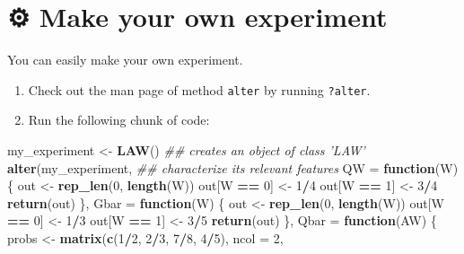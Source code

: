 \documentclass[11pt,openright,twoside]{book}
\newenvironment{Shaded}{\begin{snugshade}}{\end{snugshade}}
\newcommand{\CommentTok}[1]{\textcolor[rgb]{0.56,0.35,0.01}{\textit{#1}}}
\newcommand{\ControlFlowTok}[1]{\textcolor[rgb]{0.13,0.29,0.53}{\textbf{#1}}}
\newcommand{\DataTypeTok}[1]{\textcolor[rgb]{0.13,0.29,0.53}{#1}}
\newcommand{\DecValTok}[1]{\textcolor[rgb]{0.00,0.00,0.81}{#1}}
\newcommand{\KeywordTok}[1]{\textcolor[rgb]{0.13,0.29,0.53}{\textbf{#1}}}
\newcommand{\NormalTok}[1]{#1}
\newcommand{\OperatorTok}[1]{\textcolor[rgb]{0.81,0.36,0.00}{\textbf{#1}}}
\newcommand{\StringTok}[1]{\textcolor[rgb]{0.31,0.60,0.02}{#1}}
\newcommand{\gear}{\usebox{\gearbox}\;}
\theoremstyle{definition}
\theoremstyle{definition}
\theoremstyle{definition}
\theoremstyle{remark}
\begin{document}
\hypertarget{exo-make-own-experiment}{%
\section{\texorpdfstring{⚙ \gear Make your own experiment}{⚙ Make your own experiment}}\label{exo-make-own-experiment}}

You can easily make your own experiment.

\begin{enumerate}
\def\labelenumi{\arabic{enumi}.}
\item
  Check out the man page of method \texttt{alter} by running \texttt{?alter}.
\item
  Run the following chunk of code:
\end{enumerate}

\begin{Shaded}
\begin{Highlighting}[]
\NormalTok{my_experiment <-}\StringTok{ }\KeywordTok{LAW}\NormalTok{() }\CommentTok{## creates an object of class 'LAW'}
\KeywordTok{alter}\NormalTok{(my_experiment,   }\CommentTok{## characterize its relevant features}
      \DataTypeTok{QW =} \ControlFlowTok{function}\NormalTok{(W) \{}
\NormalTok{        out <-}\StringTok{ }\KeywordTok{rep_len}\NormalTok{(}\DecValTok{0}\NormalTok{, }\KeywordTok{length}\NormalTok{(W))}
\NormalTok{        out[W }\OperatorTok{==}\StringTok{ }\DecValTok{0}\NormalTok{] <-}\StringTok{ }\DecValTok{1}\OperatorTok{/}\DecValTok{4}
\NormalTok{        out[W }\OperatorTok{==}\StringTok{ }\DecValTok{1}\NormalTok{] <-}\StringTok{ }\DecValTok{3}\OperatorTok{/}\DecValTok{4}
        \KeywordTok{return}\NormalTok{(out)}
\NormalTok{      \},}
      \DataTypeTok{Gbar =} \ControlFlowTok{function}\NormalTok{(W) \{}
\NormalTok{        out <-}\StringTok{ }\KeywordTok{rep_len}\NormalTok{(}\DecValTok{0}\NormalTok{, }\KeywordTok{length}\NormalTok{(W))}
\NormalTok{        out[W }\OperatorTok{==}\StringTok{ }\DecValTok{0}\NormalTok{] <-}\StringTok{ }\DecValTok{1}\OperatorTok{/}\DecValTok{3}
\NormalTok{        out[W }\OperatorTok{==}\StringTok{ }\DecValTok{1}\NormalTok{] <-}\StringTok{ }\DecValTok{3}\OperatorTok{/}\DecValTok{5}
        \KeywordTok{return}\NormalTok{(out)}
\NormalTok{      \},}
      \DataTypeTok{Qbar =} \ControlFlowTok{function}\NormalTok{(AW) \{}
\NormalTok{        probs <-}\StringTok{ }\KeywordTok{matrix}\NormalTok{(}\KeywordTok{c}\NormalTok{(}\DecValTok{1}\OperatorTok{/}\DecValTok{2}\NormalTok{, }\DecValTok{2}\OperatorTok{/}\DecValTok{3}\NormalTok{, }\DecValTok{7}\OperatorTok{/}\DecValTok{8}\NormalTok{, }\DecValTok{4}\OperatorTok{/}\DecValTok{5}\NormalTok{), }\DataTypeTok{ncol =} \DecValTok{2}\NormalTok{,}

\end{Highlighting}
\end{Shaded}
\end{document}
